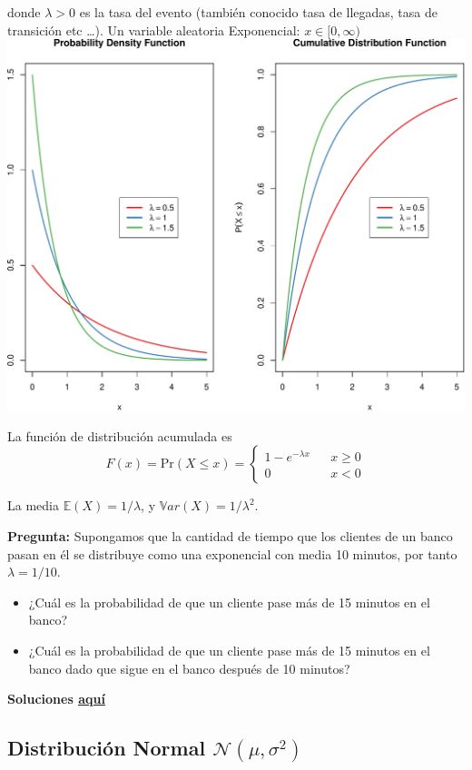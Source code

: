 \documentclass[]{article}
\def\tightlist{}
\numberwithin{equation}{section}
\begin{document}
donde \(\lambda>0\) es la tasa del evento (también conocido tasa de
llegadas, tasa de transición etc \ldots{}). Un variable aleatoria
Exponencial: \(x \in [0,\infty)\)
\includegraphics{tema4_files/figure-latex/unnamed-chunk-10-1.pdf}

La función de distribución acumulada es \[
F(x) = \mbox{Pr}(X\leq x) = 
  \left\{
    \begin{array}{lcc}
      1- e^{-\lambda x} & & x\geq 0 \\
      0                 & & x < 0
    \end{array}
  \right.
\]

La media \(\mathbb{E}(X) = 1/\lambda\), y
\(\mathbb{V}ar(X) = 1/\lambda^2\).

\textbf{Pregunta:} Supongamos que la cantidad de tiempo que los clientes
de un banco pasan en él se distribuye como una exponencial con media 10
minutos, por tanto \(\lambda=1/10\).

\begin{itemize}
\tightlist
\item
  ¿Cuál es la probabilidad de que un cliente pase más de 15 minutos en
  el banco?
\item
  ¿Cuál es la probabilidad de que un cliente pase más de 15 minutos en
  el banco dado que sigue en el banco después de 10 minutos?
\end{itemize}

\textbf{Soluciones \href{IntroSM_sol.html}{aquí}}

\subsection{\texorpdfstring{Distribución Normal
\(\mathcal{N}(\mu,\sigma^2)\)}{Distribución Normal \textbackslash{}mathcal\{N\}(\textbackslash{}mu,\textbackslash{}sigma\^{}2)}}\label{distribucion-normal-mathcalnmusigma2}
\end{document}
